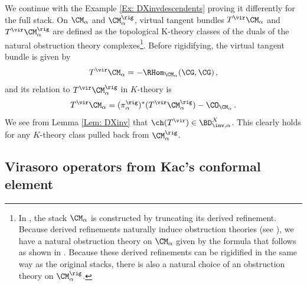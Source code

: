 \begin{example}
\notready\label{ex: invdescendents}
We continue with the Example \ref{Ex: DXinvdescendents} proving it differently for the full stack.  On $\CM_{\alpha}$ and $\CM^{\rig}_{\alpha}$, virtual tangent bundles $T^{\vir}\CM_{\alpha}$ and $T^{\vir}\CM_{\alpha}^{\rig}$ are defined as the topological K-theory classes of the duals of the natural obstruction theory complexes\footnote{In \cite{TV07}, the stack $\CM_{\alpha}$ is constructed by truncating its derived refinement. Because derived refinements naturally induce obstruction theories (see \cite[Proposition 1.2]{STV}), we have a natural obstruction theory on $\CM_{\alpha}$ given by the formula that follows as shown in \cite[Corollary 3.29]{TV07}. Because these derived refinements can be rigidified in the same way as the original stacks, there is also a natural choice of an obstruction theory on $\CM^{\rig}_{\alpha}$.}.  Before rigidifying, the virtual tangent bundle is given by $$T^\vir\CM_{\alpha}=-\RHom_{\CM_\alpha}(\CG,\CG)\,,$$
and its relation to  $T^\vir\CM^{\rig}_{\alpha}$ in $K$-theory is
$$
T^\vir\CM_\alpha = (\pi^{\rig}_\alpha)^*(T^\vir\CM^{\rig}_\alpha) - \CO_{\CM_\alpha}\,.
$$
  We see from Lemma \ref{Lem: DXinv} that $\ch(T^{\vir})\in \BD^X_{\inv, \alpha}$. This clearly holds for any $K$-theory class pulled back from $\CM^{\rig}_{\alpha}$.
\end{example}






\subsection{Virasoro operators from Kac's conformal element}
\label{sec: virasorocomparison}

